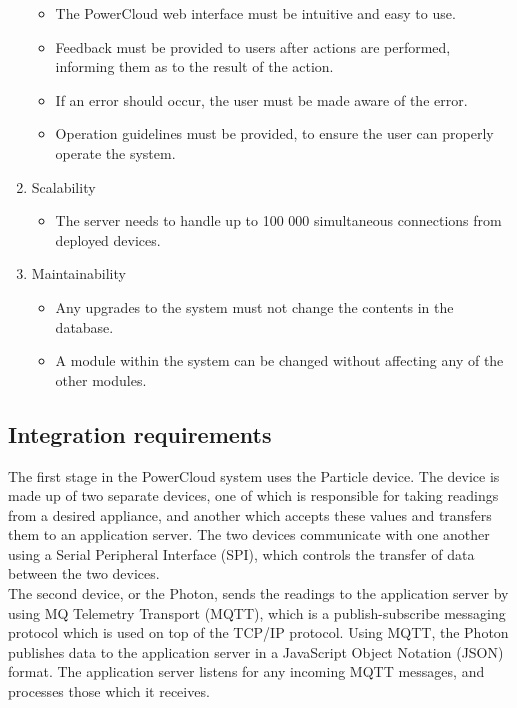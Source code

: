 \documentclass{article}
\begin{document}
\begin{enumerate}
\begin{itemize}
				\item The PowerCloud web interface must be intuitive and 
				easy to use.
				\item Feedback must be provided to users after actions 
				are performed, informing them as to the result of the 
				action.
				\item If an error should occur, the user must be made 
				aware of the error.
				\item Operation guidelines must be provided, to ensure 
				the user can properly operate the system.
			\end{itemize}
		\item Scalability
			\begin{itemize}
				\item The server needs to handle up to 100 000 
				simultaneous connections from deployed devices.
			\end{itemize}
		\item Maintainability
			\begin{itemize}
				\item Any upgrades to the system must not change the 
				contents in the database.
				\item A module within the system can be changed without 
				affecting any of the other modules.
			\end{itemize}
	\end{enumerate}
	
	\newpage
	
	\subsection{Integration requirements}
	
	The first stage in the PowerCloud system uses the Particle device. 
	The device is made up of two separate devices, one of which is 
	responsible for taking readings from a desired appliance, and another 
	which accepts these values and transfers them to an application 
	server. The two devices communicate with one another using a Serial 
	Peripheral Interface (SPI), which controls the transfer of data 
	between the two devices.\\
	
	The second device, or the Photon, sends the readings to the 
	application server by using MQ Telemetry Transport (MQTT), which is a 
	publish-subscribe messaging protocol which is used on top of the 
	TCP/IP protocol. Using MQTT, the Photon publishes data to the 
	application server in a JavaScript Object Notation (JSON) format. The 
	application server listens for any incoming MQTT messages, and 
	processes those which it receives.\\
	
\end{document}
